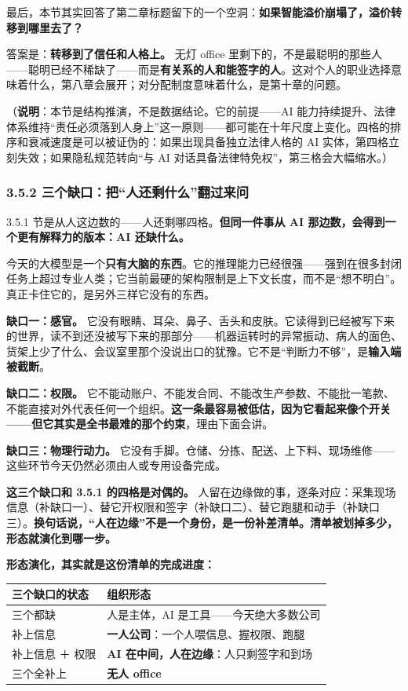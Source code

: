\documentclass[11pt,a4paper]{ctexart}
\begin{document}
最后，本节其实回答了第二章标题留下的一个空洞：\textbf{如果智能溢价崩塌了，溢价转移到哪里去了？}

答案是：\textbf{转移到了信任和人格上。} 无灯 office 里剩下的，不是最聪明的那些人——聪明已经不稀缺了——而是\textbf{有关系的人和能签字的人}。这对个人的职业选择意味着什么，第八章会展开；对分配制度意味着什么，是第十章的问题。

（\textbf{说明}：本节是结构推演，不是数据结论。它的前提——AI 能力持续提升、法律体系维持“责任必须落到人身上”这一原则——都可能在十年尺度上变化。四格的排序和衰减速度是可以被证伪的：如果出现具备独立法律人格的 AI 实体，第四格立刻失效；如果隐私规范转向“与 AI 对话具备法律特免权”，第三格会大幅缩水。）

\subsubsection{3.5.2 三个缺口：把“人还剩什么”翻过来问}

3.5.1 节是从人这边数的——人还剩哪四格。\textbf{但同一件事从 AI 那边数，会得到一个更有解释力的版本：AI 还缺什么。}

今天的大模型是一个\textbf{只有大脑的东西}。它的推理能力已经很强——强到在很多封闭任务上超过专业人类；它当前最硬的架构限制是上下文长度，而不是“想不明白”。真正卡住它的，是另外三样它没有的东西。

\textbf{缺口一：感官。} 它没有眼睛、耳朵、鼻子、舌头和皮肤。它读得到已经被写下来的世界，读不到还没被写下来的那部分——机器运转时的异常振动、病人的面色、货架上少了什么、会议室里那个没说出口的犹豫。它不是“判断力不够”，是\textbf{输入端被截断}。

\textbf{缺口二：权限。} 它不能动账户、不能发合同、不能改生产参数、不能批一笔款、不能直接对外代表任何一个组织。\textbf{这一条最容易被低估，因为它看起来像个开关——但它其实是全书最难的那个约束}，理由下面会讲。

\textbf{缺口三：物理行动力。} 它没有手脚。仓储、分拣、配送、上下料、现场维修——这些环节今天仍然必须由人或专用设备完成。

\textbf{这三个缺口和 3.5.1 的四格是对偶的。} 人留在边缘做的事，逐条对应：采集现场信息（补缺口一）、替它开权限和签字（补缺口二）、替它跑腿和动手（补缺口三）。\textbf{换句话说，“人在边缘”不是一个身份，是一份补差清单。清单被划掉多少，形态就演化到哪一步。}

\textbf{形态演化，其实就是这份清单的完成进度：}

\begin{center}

\begin{tabularx}{\textwidth}{lX}
\toprule
三个缺口的状态 & 组织形态 \\
\midrule
三个都缺 & 人是主体，AI 是工具——今天绝大多数公司 \\
补上信息 & \textbf{一人公司}：一个人喂信息、握权限、跑腿 \\
补上信息 ＋ 权限 & \textbf{AI 在中间，人在边缘}：人只剩签字和到场 \\
三个全补上 & \textbf{无人 office} \\
\bottomrule
\end{tabularx}
\end{center}
\end{document}
